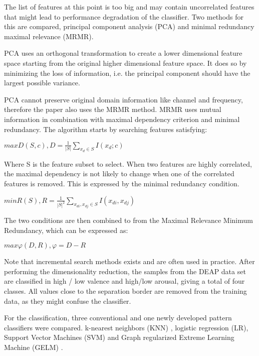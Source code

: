 \npar

The list of features at this point is too big and may contain uncorrelated features that might lead to performance degradation of the classifier. Two methods for this are compared, principal component analysis (PCA) and minimal redundancy maximal relevance (MRMR). 

\npar

PCA uses an orthogonal transformation to create a lower dimensional feature space starting from the original higher dimensional feature space. It does so by minimizing the loss of information, i.e. the principal component should have the largest possible variance. 

\npar

PCA cannot preserve original domain information like channel and frequency, therefore the paper also uses the MRMR method. MRMR uses mutual information in combination with maximal dependency criterion and minimal redundancy. The algorithm starts by searching features satisfying:

\begin{center}
$max D(S,c), D=\frac{1}{|S|} {\displaystyle \sum_{x_d \in S}} I(x_d;c)$
\end{center}

Where S is the feature subset to select. When two features are highly correlated, the maximal dependency is not likely to change when one of the correlated features is removed. This is expressed by the minimal redundancy condition.

\begin{center}
$min R(S), R = \frac{1}{|S|^2} {\displaystyle \sum_{x_{di}, x_{dj} \in S}} I(x_{di},x_{dj})$
\end{center}

The two conditions are then combined to from the Maximal Relevance Minimum Redundancy, which can be expressed as:

\begin{center}
$max \varphi(D,R), \varphi=D-R$
\end{center}
Note that incremental search methods exists and are often used in practice. After performing the dimensionality reduction, the samples from the DEAP data set are classified in high / low valence and high/low arousal, giving a total of four classes. All values close to the separation border are removed from the training data, as they might confuse the classifier. 

\npar 
For the classification, three conventional and one newly developed pattern classifiers were compared. k-nearest neighbors (KNN) , logistic regression (LR), Support Vector Machines (SVM) and Graph regularized Extreme Learning Machine (GELM) . 


